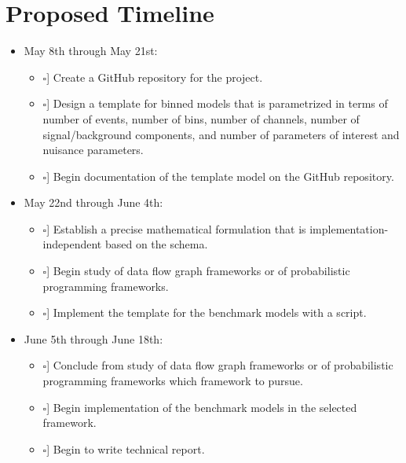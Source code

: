 \newcommand{\checkedBox}{\makebox[0pt][l]{$\square$}\raisebox{.15ex}{\hspace{0.1em}$\checkmark$}}
\newcommand{\uncheckedBox}{\makebox[0pt][l]{$\square$}\raisebox{.15ex}{\hspace{0.1em}\phantom{$\checkmark$}}}

\section{Proposed Timeline}

\begin{itemize}
 \item May 8th through May 21st:
       \begin{itemize}
        \item [\uncheckedBox] Create a GitHub repository for the project.
        \item [\uncheckedBox] Design a template for binned models that is parametrized in terms of number of events, number of bins, number of channels, number of signal/background components, and number of parameters of interest and nuisance parameters.
        \item [\uncheckedBox] Begin documentation of the template model on the GitHub repository.
       \end{itemize}
 \item May 22nd through June 4th:
       \begin{itemize}
        \item [\uncheckedBox] Establish a precise mathematical formulation that is implementation-independent based on the  schema.
        \item [\uncheckedBox] Begin study of data flow graph frameworks or of probabilistic programming frameworks.
        \item [\uncheckedBox] Implement the template for the benchmark models with a  script.
       \end{itemize}
 \item June 5th through June 18th:
       \begin{itemize}
        \item [\uncheckedBox] Conclude from study of data flow graph frameworks or of probabilistic programming frameworks which framework to pursue.
        \item [\uncheckedBox] Begin implementation of the benchmark models in the selected framework.
        \item [\uncheckedBox] Begin to write technical report.

\end{itemize}
\end{itemize}
